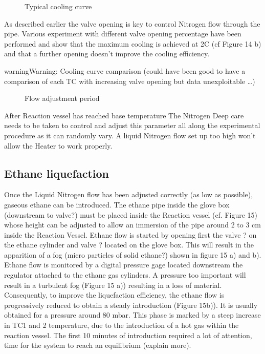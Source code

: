 \documentclass[letterpaper,10pt,english]{jupyterBook}
\begin{document}
\begin{figure}[htbp]
\centering
\capstart

\noindent{}
\caption{Typical cooling curve}\label{\detokenize{Chapter7/Chapter7:id5}}\end{figure}

\sphinxAtStartPar
As described earlier the valve opening is key to control Nitrogen flow through the pipe.
Various experiment with different valve opening percentage have been performed and show that the maximum cooling is achieved at 2C (cf Figure 14 b) and that a further opening doesn’t improve the cooling efficiency.

\begin{sphinxadmonition}{warning}{Warning:}
\sphinxAtStartPar
Cooling curve comparison (could have been good to have a comparison of each TC with increasing valve opening but data unexploitable …)
\end{sphinxadmonition}

\begin{figure}[htbp]
\centering
\capstart

\noindent{}
\caption{Flow adjustment period}\label{\detokenize{Chapter7/Chapter7:id6}}\end{figure}

\sphinxAtStartPar
After Reaction vessel has reached base temperature The Nitrogen
Deep care needs to be taken to control and adjust this parameter all along the experimental procedure as it can randomly vary. A liquid Nitrogen flow set up too high won’t allow the Heater to work properly.


\subsection{Ethane liquefaction}
\label{\detokenize{Chapter7/Chapter7:ethane-liquefaction}}
\sphinxAtStartPar
Once the Liquid Nitrogen flow has been adjusted correctly (as low as possible), gaseous ethane can be introduced. The ethane pipe inside the glove box (downstream to valve?) must be placed inside the Reaction vessel (cf. Figure 15) whose height can be adjusted to allow an immersion of the pipe around 2 to 3 cm inside the Reaction Vessel. Ethane flow is started by opening first the valve ? on the ethane cylinder and valve ? located on the glove box. This will result in the apparition of a fog (micro particles of solid ethane?) shown in figure 15 a) and b). Ethane flow is monitored by a digital pressure gage located downstream the regulator attached to the ethane gas cylinders. A pressure too important will result in a turbulent fog (Figure 15 a)) resulting in a loss of material. Consequently, to improve the liquefaction efficiency, the ethane flow is progressively reduced to obtain a steady introduction (Figure 15b)). It is usually obtained for a pressure around 80 mbar.
This phase is marked by a steep increase in TC1 and 2 temperature, due to the introduction of a hot gas within the reaction vessel. The first 10 minutes of introduction required a lot of attention, time for the system to reach an equilibrium (explain more).
\end{document}
